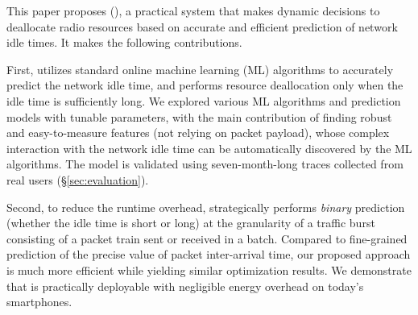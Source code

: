 

This paper proposes \NAMEFULL (\NAME), a practical system that makes dynamic decisions to deallocate radio resources based on accurate and efficient prediction of network idle times. It makes the following contributions.




First, \NAME utilizes standard online machine learning (ML) algorithms to accurately predict the network idle time, and performs resource deallocation only when the idle time is sufficiently long. We explored various ML algorithms and prediction models with tunable parameters, with the main contribution of finding robust and easy-to-measure features (not relying on packet payload), whose complex interaction with the network idle time can be automatically discovered by the ML algorithms. The model is validated using seven-month-long traces collected from real users (\S\ref{sec:evaluation}).

Second, to reduce the runtime overhead, \NAME strategically performs \emph{binary} prediction (\ie whether the idle time is short or long) at the granularity of a traffic burst consisting of a packet train sent or received in a batch. Compared to fine-grained prediction of the precise value of packet inter-arrival time, our proposed approach is much more efficient while yielding similar optimization results.
We demonstrate that \NAME is practically deployable with negligible energy overhead on today's smartphones.

